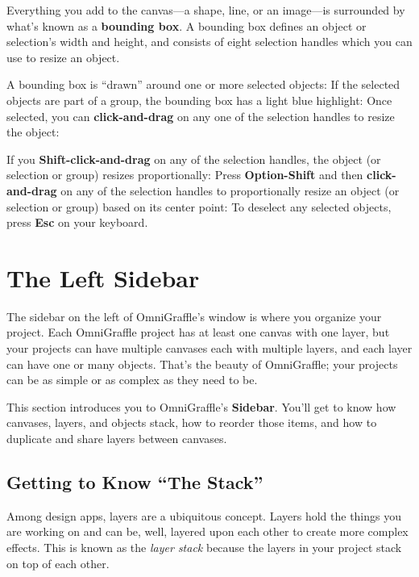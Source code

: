 \documentclass[../main.tex]{subfiles}
\begin{document}
Everything you add to the canvas—a shape, line, or an image—is surrounded by what's known as a
\textbf{bounding box}. A bounding box defines an object or selection's width and height, and
consists of
eight selection handles which you can use to resize an object.


A bounding box is ``drawn'' around one or more selected objects:
If the selected objects are part of a group, the bounding box has a light blue highlight:
Once selected, you can \textbf{click-and-drag} on any one of the selection handles to resize the
object:

If you \textbf{Shift-click-and-drag} on any of the selection handles, the object (or selection
or group)
resizes proportionally:
Press \textbf{Option-Shift} and then \textbf{click-and-drag} on any of the selection handles to
proportionally resize an object (or selection or group) based on its center point:
To deselect any selected objects, press \textbf{Esc} on your keyboard.

\section{The Left Sidebar}
The sidebar on the left of OmniGraffle's window is where you organize your project. Each
OmniGraffle project
has at least one canvas with one layer, but your projects can have multiple canvases each with
multiple
layers, and each layer can have one or many objects. That's the beauty of OmniGraffle; your
projects can be
as simple or as complex as they need to be.

This section introduces you to OmniGraffle's \textbf{Sidebar}. You'll get to know how canvases,
layers, and objects
stack, how to reorder those items, and how to duplicate and share layers between canvases.

\subsection{Getting to Know “The Stack”}
Among design apps, layers are a ubiquitous concept. Layers hold the things you are working on
and can be,
well, layered upon each other to create more complex effects. This is known as the \textit{layer
stack}
because the layers in your project stack on top of each other.
\end{document}

